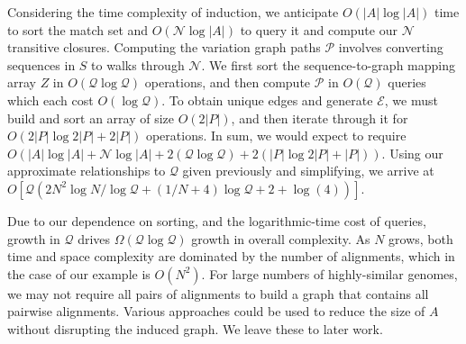 \documentclass{bioinfo}
\theoremstyle{definition}
\begin{document}
Considering the time complexity of induction, we anticipate $O(|A|\log|A|)$ time to sort the match set and $O(\mathcal{N} \log |A|)$ to query it and compute our $\mathcal{N}$ transitive closures.
Computing the variation graph paths $\mathcal{P}$ involves converting sequences in $S$ to walks through $\mathcal{N}$.
We first sort the sequence-to-graph mapping array $Z$ in $O(\mathcal{Q} \log \mathcal{Q})$ operations, and then compute $\mathcal{P}$ in $O(\mathcal{Q})$ queries which each cost $O(\log \mathcal{Q})$.
To obtain unique edges and generate $\mathcal{E}$, we must build and sort an array of size $O(2|P|)$, and then iterate through it for $O(2|P| \log 2|P| + 2|P|)$ operations.
In sum, we would expect to require $O(|A|\log|A| + \mathcal{N} \log |A| + 2(\mathcal{Q} \log \mathcal{Q}) + 2(|P| \log 2|P| + |P|))$.
Using our approximate relationships to $\mathcal{Q}$ given previously and simplifying, we arrive at $O[\mathcal{Q}(2N^2 \log N / \log \mathcal{Q} + (1/N + 4)\log \mathcal{Q} + 2 + \log(4))]$.

Due to our dependence on sorting, and the logarithmic-time cost of queries, growth in $\mathcal{Q}$ drives $\Omega(\mathcal{Q} \log \mathcal{Q})$ growth in overall complexity.
As $N$ grows, both time and space complexity are dominated by the number of alignments, which in the case of our example is $O(N^2)$.
For large numbers of highly-similar genomes, we may not require all pairs of alignments to build a graph that contains all pairwise alignments.
Various approaches could be used to reduce the size of $A$ without disrupting the induced graph.
We leave these to later work.



\end{document}
